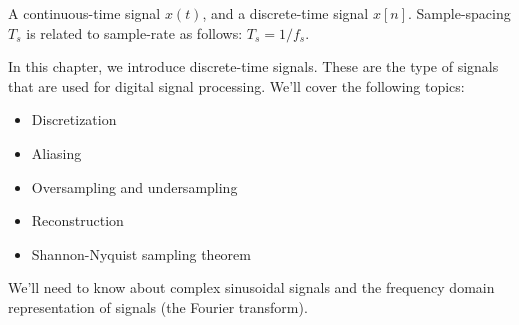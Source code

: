 \begin{marginfigure}
  \begin{center}
  \end{center}
  \caption{A continuous-time signal $x(t)$, and a discrete-time signal
    $x[n]$. Sample-spacing $T_s$ is related to sample-rate as follows:
    $T_s = 1/f_s$.}

\end{marginfigure}
In this chapter, we introduce discrete-time signals. These are the
type of signals that are used for digital signal processing. We'll
cover the following topics:
\begin{itemize}
  \item Discretization
  \item Aliasing
  \item Oversampling and undersampling
  \item Reconstruction
  \item Shannon-Nyquist sampling theorem
\end{itemize}
We'll need to know about complex sinusoidal signals and the frequency
domain representation of signals (the Fourier transform).

